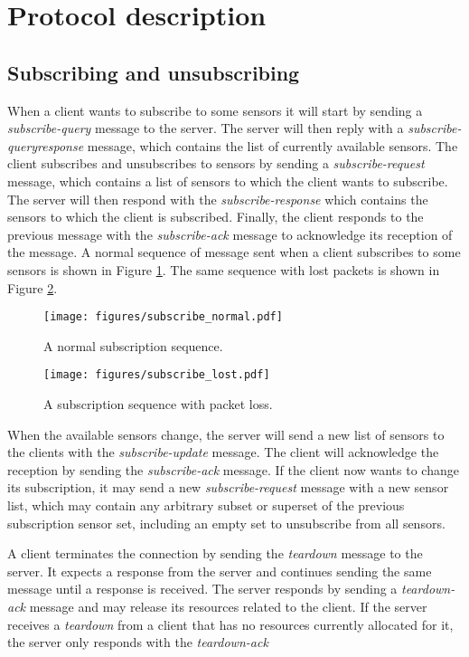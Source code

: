 \documentclass[a4paper]{article}
\begin{document}
\section{Protocol description}
\subsection{Subscribing and unsubscribing}
When a client wants to subscribe to some sensors it will start by sending a 
\emph{subscribe-query} message to the server. The server will then reply with
a \emph{subscribe-queryresponse} message, which contains the list of currently
available sensors. The client subscribes and unsubscribes to sensors by sending a 
\emph{subscribe-request} message, which contains a list of sensors to which 
the client wants to subscribe. The server will then respond with the
\emph{subscribe-response} which contains the sensors to which the client is
subscribed. Finally, the client responds to the previous message with the 
\emph{subscribe-ack} message to acknowledge its reception of the message.
A normal sequence of message sent when a client subscribes to some sensors
is shown in Figure \ref{fig:sub_normal}. The same sequence with lost packets 
is shown in Figure \ref{fig:sub_lost}.

\begin{figure}[htb]
	\centering
    \texttt{[image: figures/subscribe\_normal.pdf]}
    \caption{A normal subscription sequence.}
    \label{fig:sub_normal}
\end{figure}

\begin{figure}[htb]
	\centering
    \texttt{[image: figures/subscribe\_lost.pdf]}
    \caption{A subscription sequence with packet loss.}
    \label{fig:sub_lost}
\end{figure}

\newpage

When the available sensors change, the server will send a new list of sensors
to the clients with the \emph{subscribe-update} message. The client will
acknowledge the reception by sending the \emph{subscribe-ack} message. If the
client now wants to change its subscription, it may send a new 
\emph{subscribe-request} message with a new sensor list, which may contain any arbitrary subset or superset of the previous subscription sensor set, including an empty set to unsubscribe from all sensors.

A client terminates the connection by sending the \emph{teardown} message to the
server. It expects a response from the server and continues sending the same
message until a response is received. The server responds by sending a
\emph{teardown-ack} message and may release its resources
related to the client. If the server receives a \emph{teardown} from a client that has no resources currently allocated for it, the server only responds with the \emph{teardown-ack}
\end{document}
